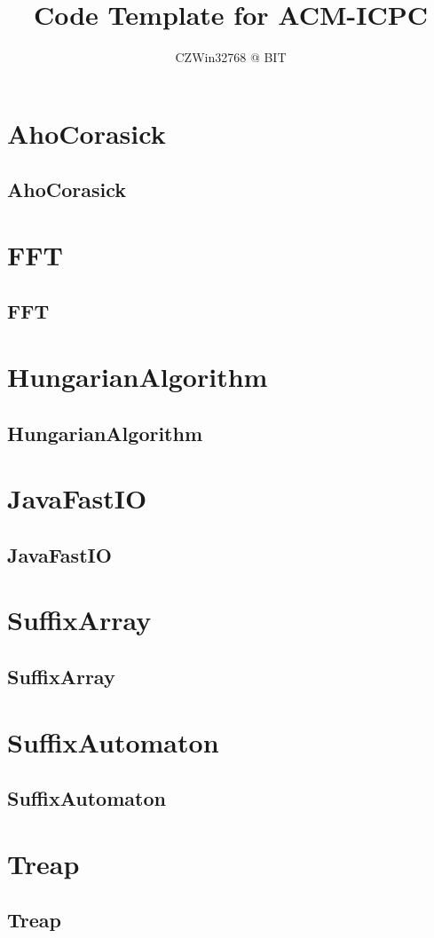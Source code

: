 \documentclass[a4paper, twocolumn]{article}
\title{Code Template for ACM-ICPC}
\author{CZWin32768 @ BIT}
\begin{document}
\begin{titlepage}
\maketitle
\thispagestyle{empty}
\pagebreak
\pagestyle{fancy}
\lhead{}
\rhead{}
\cfoot{}
\tableofcontents
\end{titlepage}

\pagestyle{fancy}
\cfoot{- \thepage \ -}
  
\section{AhoCorasick}
\subsection{AhoCorasick}

\section{FFT}
\subsection{FFT}

\section{HungarianAlgorithm}
\subsection{HungarianAlgorithm}

\section{JavaFastIO}
\subsection{JavaFastIO}

\section{SuffixArray}
\subsection{SuffixArray}

\section{SuffixAutomaton}
\subsection{SuffixAutomaton}

\section{Treap}
\subsection{Treap}

\end{document}
